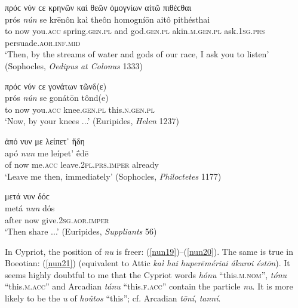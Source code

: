 \begin{exe}
\ex πρόϲ νύν ϲε κρηνῶν καὶ θεῶν ὁμογνίων αἰτῶ πιθέϲθαι\\
\gll prós \emph{nún} se krēnôn kaì theôn homogníōn aitô pithésthai\\
to now you.\textsc{acc} spring.\textsc{gen.pl} and god.\textsc{gen.pl}
akin.\textsc{m.gen.pl} ask.\textsc{1sg.prs} persuade.\textsc{aor.inf.mid}\\
\trans `Then, by the streams of water and gods of our race, I ask you to listen' (Sophocles, \textit{Oedipus at Colonus} 1333)
\label{nun15}
\end{exe}

\begin{exe}
\ex πρόϲ νύν ϲε γονάτων τῶνδ(ε)\\
\gll prós \emph{nún} se gonátōn tônd(e)\\
to now you.\textsc{acc} knee.\textsc{gen.pl} this.\textsc{n.gen.pl}\\
\trans `Now, by your knees ...' (Euripides, \textit{Helen} 1237)
\label{nun16}
\end{exe}

\begin{exe}
\ex ἀπό νυν με λείπετ᾽ ἤδη\\
\gll apó \emph{nun} me leípet' ḗdē\\
of now me.\textsc{acc} leave.\textsc{2pl.prs.imper} already\\
\trans `Leave me then, immediately' (Sophocles, \textit{Philoctetes} 1177)
\label{nun17}
\end{exe}

\begin{exe}
\ex μετά νυν δόϲ\\
\gll metá \emph{nun} dós\\
after now give.\textsc{2sg.aor.imper}\\
\trans `Then share ...' (Euripides, \textit{Suppliants} 56)
\label{nun18}
\end{exe}

In Cypriot, the position of \textit{nu} is freer: (\ref{nun19})--(\ref{nun20}). The same is true in Boeotian: (\ref{nun21}) (equivalent to Attic \textit{kaì hai huperēmériai ákuroi éstōn}). It seems highly doubtful to me that the Cypriot words \textit{hónu} ``this.\textsc{m.nom}'', \textit{tónu} ``this.\textsc{m.acc}'' and Arcadian \textit{tánu} ``this.\textsc{f.acc}'' contain the particle \textit{nu}. It is more likely to be the \textit{u} of \textit{hoûtos} ``this''; cf. Arcadian \textit{tōní}, \textit{tanní}.

